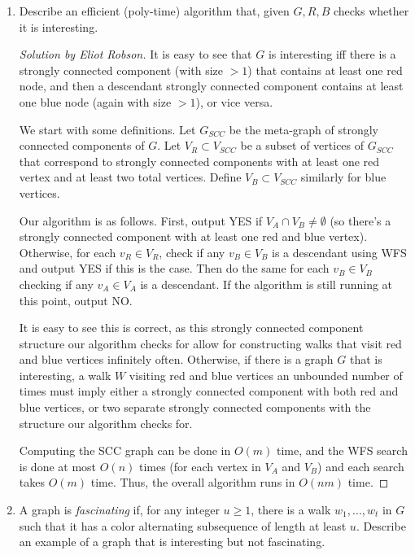 \documentclass{article}
\newenvironment{solution}[1]{\begin{proof}[Solution by #1]}{\end{proof}}
\begin{document}
\begin{enumerate}
	\item Describe an efficient (poly-time) algorithm that, given \(G, R, B\) checks whether it is interesting. 
	
	\begin{solution}{Eliot Robson}
		It is easy to see that \(G\) is interesting iff there is a strongly connected component (with size \(> 1\)) that contains at least one red node, and then a descendant strongly connected component contains at least one blue node (again with size \(> 1\)), or vice versa.
		
		We start with some definitions. Let \(G_{SCC}\) be the meta-graph of strongly connected components of \(G\). Let \(V_R \subset V_{SCC}\) be a subset of vertices of \(G_{SCC}\) that correspond to strongly connected components with at least one red vertex and at least two total vertices. Define \(V_B \subset V_{SCC}\) similarly for blue vertices.
		
		Our algorithm is as follows. First, output YES if \(V_A \cap V_B \neq \emptyset\) (so there's a strongly connected component with at least one red and blue vertex). Otherwise, for each \(v_R \in V_R\), check if any \(v_B \in V_B\) is a descendant using WFS and output YES if this is the case. Then do the same for each \(v_B \in V_B\) checking if any \(v_A \in V_A\) is a descendant. If the algorithm is still running at this point, output NO.
		
		It is easy to see this is correct, as this strongly connected component structure our algorithm checks for allow for constructing walks that visit red and blue vertices infinitely often. Otherwise, if there is a graph \(G\) that is interesting, a walk \(W\) visiting red and blue vertices an unbounded number of times must imply either a strongly connected component with both red and blue vertices, or two separate strongly connected components with the structure our algorithm checks for.
		
		Computing the SCC graph can be done in \(O(m)\) time, and the WFS search is done at most \(O(n)\) times (for each vertex in \(V_A\) and \(V_B\)) and each search takes \(O(m)\) time. Thus, the overall algorithm runs in \(O(nm)\) time. 
	\end{solution}

	\item A graph is \emph{fascinating} if, for any integer \(u \geq 1\), there is a walk \(w_1, \dots, w_t\) in \(G\) such that it has a color alternating subsequence of length at least \(u\). Describe an example of a graph that is interesting but not fascinating.
    

\end{enumerate}
\end{document}
